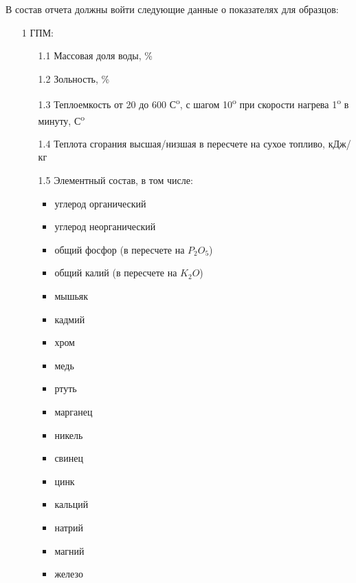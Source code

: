 \documentclass[russian,utf8]{eskdtext}
\begin{document}
   В состав отчета должны войти следующие данные о показателях для образцов: 
   \begin{enumerate}
   \item[1] ГПМ:
      \begin{enumerate}
      \item[1.1] Массовая доля воды, \%
      \item[1.2] Зольность, \%
      \item[1.3] Теплоемкость от 20 до 600 С\textsuperscript{o}, с шагом 10\textsuperscript{o} при скорости нагрева 1\textsuperscript{o} в минуту,  С\textsuperscript{o}
      \item[1.4] Теплота сгорания высшая/низшая в пересчете на сухое топливо, кДж/кг
      \item[1.5] Элементный состав, в том числе:
      \begin{itemize}
            \item углерод органический
            \item углерод неорганический
            \item общий фосфор (в пересчете на  $P_{2}O_{5}$)
            \item общий калий (в пересчете на  $K_{2}O$)
            \item мышьяк
            \item кадмий
            \item хром 
            \item медь
            \item ртуть
            \item марганец 
            \item никель 
            \item свинец 
            \item цинк
            \item кальций 
            \item натрий 
            \item магний 
            \item железо
            \end{itemize}
      \end{enumerate}
      

\end{enumerate}
\end{document}

